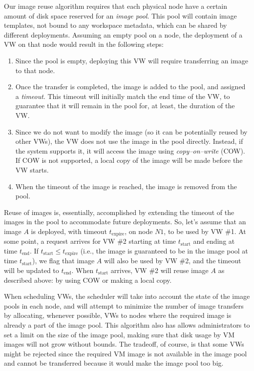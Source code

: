 Our image reuse algorithm requires that each physical node have a certain amount of disk space reserved for an \emph{image pool}. This pool will contain image templates, not bound to any workspace metadata, which can be shared by different deployments. Assuming an empty pool on a node, the deployment of a VW on that node would result in the following steps:

\begin{enumerate}
\item Since the pool is empty, deploying this VW will require transferring an image to that node.
\item Once the transfer is completed, the image is added to the pool, and assigned a \emph{timeout}. This timeout will initially match the end time of the VW, to guarantee that it will remain in the pool for, at least, the duration of the VW.
\item Since we do not want to modify the image (so it can be potentially reused by other VWs), the VW does not use the image in the pool directly. Instead, if the system supports it, it will access the image using \emph{copy--on--write} (COW). If COW is not supported, a local copy of the image will be made before the VW starts.
\item When the timeout of the image is reached, the image is removed from the pool.
\end{enumerate}

Reuse of images is, essentially, accomplished by extending the timeout of the images in the pool to accommodate future deployments. So, let's assume that an image $A$ is deployed, with timeout $t_\textrm{expire}$, on node $N1$, to be used by VW \#1. At some point, a request arrives for VW \#2 starting at time $t_\textrm{start}$ and ending at time $t_\textrm{end}$. If $t_\textrm{start} \leqslant t_\textrm{expire}$ (i.e., the image is guaranteed to be in the image pool at time $t_\textrm{start}$), we flag that image $A$ will also be used by VW \#2, and the timeout will be updated to $t_\textrm{end}$. When $t_\textrm{start}$ arrives, VW \#2 will reuse image $A$ as described above: by using COW or making a local copy.

When scheduling VWs, the scheduler will take into account the state of the image pools in each node, and will attempt to minimize the number of image transfers by allocating, whenever possible, VWs to nodes where the required image is already a part of the image pool. This algorithm also has allows administrators to set a limit on the size of the image pool, making sure that disk usage by VM images will not grow without bounds. The tradeoff, of course, is that some VWs might be rejected since the required VM image is not available in the image pool and cannot be transferred because it would make the image pool too big.


